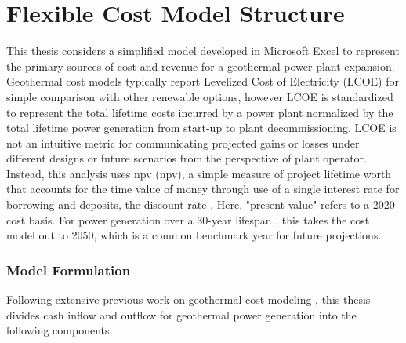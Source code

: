\section{Flexible Cost Model Structure}\label{ch4:cm_structure}

This thesis considers a simplified model developed in Microsoft Excel to represent the primary sources of cost and revenue for a geothermal power plant expansion. Geothermal cost models typically report Levelized Cost of Electricity (LCOE) for simple comparison with other renewable options, however LCOE is standardized to represent the total lifetime costs incurred by a power plant normalized by the total lifetime power generation from start-up to plant decommissioning. LCOE is not an intuitive metric for communicating projected gains or losses under different designs or future scenarios from the perspective of plant operator. Instead, this analysis uses \acrlong{npv} (\acrshort{npv}), a simple measure of project lifetime worth that accounts for the time value of money through use of a single interest rate for borrowing and deposits, the discount rate \citep[p.\ 195-215]{de_neufville_flexibility_2011}. Here, "present value" refers to a 2020 cost basis. For power generation over a 30-year lifespan \citep{entingh_volume_2006}, this takes the cost model out to 2050, which is a common benchmark year for future projections. 

\subsubsection{Model Formulation}
Following extensive previous work on geothermal cost modeling \citep[e.g.,][]{augustine_hydrothermal_2009, beckers_introducing_2013, tester_economic_1990, tester_future_2006}, this thesis divides cash inflow and outflow for geothermal power generation into the following components:

